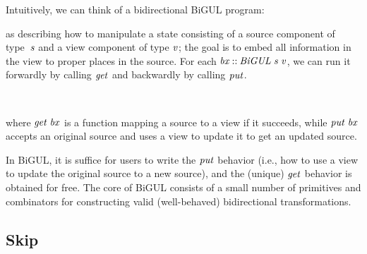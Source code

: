 Intuitively, we can think of a bidirectional BiGUL program:
\begin{hscode}\SaveRestoreHook
{}%
%
%
\>[3]{}\mathbin{::}\;\;\<[E]%
\ColumnHook
\end{hscode}\resethooks
as describing how to manipulate a state consisting of
a source component of type~\ensuremath{\Varid{s}} and a view component of type \ensuremath{\Varid{v}};
the goal is to embed all information in the view to proper places
in the source. For each \ensuremath{\Varid{bx}\mathbin{::}\Conid{BiGUL}\;\Varid{s}\;\Varid{v}}, we can run it forwardly by calling \ensuremath{\Varid{get}}
and backwardly by calling \ensuremath{\Varid{put}}.
\begin{hscode}\SaveRestoreHook
{}%
%
%
\>[3]{}\;\mathbin{::}\to {}\;\<[E]%
\\
\>[3]{}\;\mathbin{::}\to {}\to {}\;\<[E]%
\ColumnHook
\end{hscode}\resethooks
where \ensuremath{\Varid{get}\;\Varid{bx}} is a function mapping a source to a view if it succeeds,
while \ensuremath{\Varid{put}\;\Varid{bx}}
accepts an original source and uses a view to update it to get an updated source.

In BiGUL, it is suffice for users to write the \ensuremath{\Varid{put}} behavior (i.e.,
how to use a view to update the original source to a new source),
and the (unique) \ensuremath{\Varid{get}} behavior is obtained for free. 
%
The core of BiGUL consists of a small number of primitives and
combinators for constructing valid (well-behaved)
bidirectional transformations.

\subsection{Skip}
 
